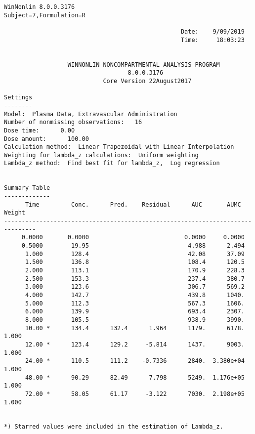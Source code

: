 \documentclass[12pt,a4paper]{article}
\begin{document}
\begin{verbatim}
WinNonlin 8.0.0.3176
Subject=7,Formulation=R

                                                  Date:    9/09/2019
                                                  Time:     18:03:23


                  WINNONLIN NONCOMPARTMENTAL ANALYSIS PROGRAM
                                   8.0.0.3176
                            Core Version 22August2017

Settings
--------
Model:  Plasma Data, Extravascular Administration
Number of nonmissing observations:   16
Dose time:      0.00
Dose amount:      100.00
Calculation method:  Linear Trapezoidal with Linear Interpolation
Weighting for lambda_z calculations:  Uniform weighting
Lambda_z method:  Find best fit for lambda_z,  Log regression


Summary Table
-------------
      Time         Conc.      Pred.    Residual      AUC       AUMC      Weight
-------------------------------------------------------------------------------
     0.0000       0.0000                           0.0000     0.0000
     0.5000        19.95                            4.988      2.494
      1.000        128.4                            42.08      37.09
      1.500        136.8                            108.4      120.5
      2.000        113.1                            170.9      228.3
      2.500        153.3                            237.4      380.7
      3.000        123.6                            306.7      569.2
      4.000        142.7                            439.8      1040.
      5.000        112.3                            567.3      1606.
      6.000        139.9                            693.4      2307.
      8.000        105.5                            938.9      3990.
      10.00 *      134.4      132.4      1.964      1179.      6178.      1.000
      12.00 *      123.4      129.2     -5.814      1437.      9003.      1.000
      24.00 *      110.5      111.2    -0.7336      2840.  3.380e+04      1.000
      48.00 *      90.29      82.49      7.798      5249.  1.176e+05      1.000
      72.00 *      58.05      61.17     -3.122      7030.  2.198e+05      1.000


*) Starred values were included in the estimation of Lambda_z.



\end{verbatim}
\end{document}
